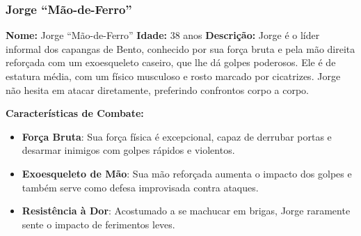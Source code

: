 \begin{personagem}
\subsubsection{Jorge ``Mão-de-Ferro''}

\textbf{Nome:} Jorge ``Mão-de-Ferro''  
\textbf{Idade:} 38 anos  
\textbf{Descrição:}  
Jorge é o líder informal dos capangas de Bento, conhecido por sua força bruta e pela mão direita reforçada com um exoesqueleto caseiro, que lhe dá golpes poderosos. Ele é de estatura média, com um físico musculoso e rosto marcado por cicatrizes. Jorge não hesita em atacar diretamente, preferindo confrontos corpo a corpo.

\textbf{Características de Combate:}
\begin{itemize}
    \item \textbf{Força Bruta}: Sua força física é excepcional, capaz de derrubar portas e desarmar inimigos com golpes rápidos e violentos.
    \item \textbf{Exoesqueleto de Mão}: Sua mão reforçada aumenta o impacto dos golpes e também serve como defesa improvisada contra ataques.
    \item \textbf{Resistência à Dor}: Acostumado a se machucar em brigas, Jorge raramente sente o impacto de ferimentos leves.
\end{itemize}
\end{personagem}

